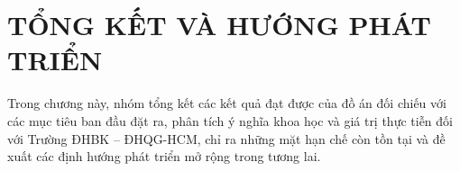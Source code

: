 \chapter{TỔNG KẾT VÀ HƯỚNG PHÁT TRIỂN}
\label{chap:tongket}

Trong chương này, nhóm tổng kết các kết quả đạt được của đồ án đối chiếu với các mục tiêu ban đầu đặt ra, phân tích ý nghĩa khoa học và giá trị thực tiễn đối với Trường ĐHBK -- ĐHQG-HCM, chỉ ra những mặt hạn chế còn tồn tại và đề xuất các định hướng phát triển mở rộng trong tương lai.

\newpage

